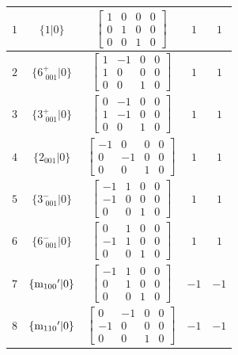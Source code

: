 \documentclass[fleqn,8pt]{jsarticle}
\begin{document}
\begin{longtable}{ccccc}
$ 1 $ & $ \{1|0\} $ & $ \begin{bmatrix} 1 & 0 & 0 & 0 \\ 0 & 1 & 0 & 0 \\ 0 & 0 & 1 & 0 \end{bmatrix} $ & $ 1 $ & $ 1 $ \\ \hline
$ 2 $ & $ \{6^{+}_{\,\,001}|0\} $ & $ \begin{bmatrix} 1 & -1 & 0 & 0 \\ 1 & 0 & 0 & 0 \\ 0 & 0 & 1 & 0 \end{bmatrix} $ & $ 1 $ & $ 1 $ \\ \hline
$ 3 $ & $ \{3^{+}_{\,\,001}|0\} $ & $ \begin{bmatrix} 0 & -1 & 0 & 0 \\ 1 & -1 & 0 & 0 \\ 0 & 0 & 1 & 0 \end{bmatrix} $ & $ 1 $ & $ 1 $ \\ \hline
$ 4 $ & $ \{2{}_{001}|0\} $ & $ \begin{bmatrix} -1 & 0 & 0 & 0 \\ 0 & -1 & 0 & 0 \\ 0 & 0 & 1 & 0 \end{bmatrix} $ & $ 1 $ & $ 1 $ \\ \hline
$ 5 $ & $ \{3^{-}_{\,\,001}|0\} $ & $ \begin{bmatrix} -1 & 1 & 0 & 0 \\ -1 & 0 & 0 & 0 \\ 0 & 0 & 1 & 0 \end{bmatrix} $ & $ 1 $ & $ 1 $ \\ \hline
$ 6 $ & $ \{6^{-}_{\,\,001}|0\} $ & $ \begin{bmatrix} 0 & 1 & 0 & 0 \\ -1 & 1 & 0 & 0 \\ 0 & 0 & 1 & 0 \end{bmatrix} $ & $ 1 $ & $ 1 $ \\ \hline
$ 7 $ & $ \{{\rm m}_{100}{}'|0\} $ & $ \begin{bmatrix} -1 & 1 & 0 & 0 \\ 0 & 1 & 0 & 0 \\ 0 & 0 & 1 & 0 \end{bmatrix} $ & $ -1 $ & $ -1 $ \\ \hline
$ 8 $ & $ \{{\rm m}_{110}{}'|0\} $ & $ \begin{bmatrix} 0 & -1 & 0 & 0 \\ -1 & 0 & 0 & 0 \\ 0 & 0 & 1 & 0 \end{bmatrix} $ & $ -1 $ & $ -1 $ \\ \hline

\end{longtable}
\end{document}
